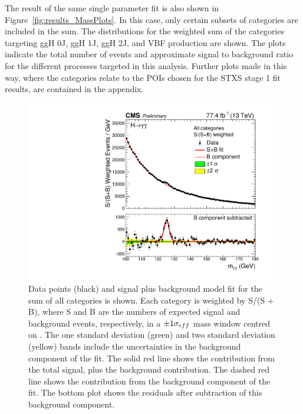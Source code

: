 The result of the same single parameter fit is also shown in Figure~\ref{fig:results_MassPlots}.
In this case, only certain subsets of categories are included in the sum.
The \mgg distributions for the weighted sum of the categories targeting 
ggH 0J, ggH 1J, ggH 2J, and VBF production are shown.
The plots indicate the total number of events and approximate signal to background ratio
for the different processes targeted in this analysis.
Further plots made in this way, 
where the categories relate to the POIs chosen for the STXS stage 1 fit results, 
are contained in the appendix. %

\begin{figure}[hptb]
\centering
\includegraphics[width=\textwidth]{Figures/Results/MassPlot.pdf}
\caption{
  Data points (black) and signal plus background model fit for the sum of all categories is shown. 
  Each category is weighted by S/(S + B), 
  where S and B are the numbers of expected signal and background events, respectively, 
  in a $\pm 1 \sigma_{eff}$ mass window centred on \mH. 
  The one standard deviation (green) and two standard deviation (yellow) bands 
  include the uncertainties in the background component of the fit. 
  The solid red line shows the contribution from the total signal, plus the background contribution. 
  The dashed red line shows the contribution from the background component of the fit. 
  The bottom plot shows the residuals after subtraction of this background component.
}
\label{fig:results_MassPlot}
\end{figure}

